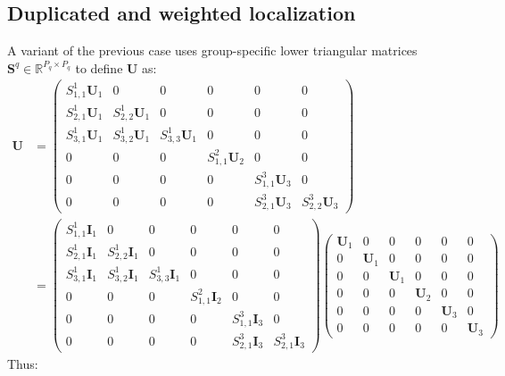 \documentclass[12pt]{scrartcl}
\begin{document}
\subsection{Duplicated and weighted localization}
A variant of the previous case uses group-specific lower triangular matrices $\mathbf{S}^q \in \mathbb{R}^{P_q \times P_q}$ to define $\mathbf{U}$ as: 
\begin{align}
\mathbf{U} & = \left( \begin{array}{ccc|c|ccc}
S^1_{1,1} \mathbf{U}_1 & 0 & 0 & 0 & 0 & 0 \\
S^1_{2,1} \mathbf{U}_1 & S^1_{2,2} \mathbf{U}_1 & 0 & 0 & 0 & 0 \\
S^1_{3,1} \mathbf{U}_1 & S^1_{3,2} \mathbf{U}_1 & S^1_{3,3} \mathbf{U}_1 & 0 & 0 & 0 \\
\hline
0 & 0 & 0 & S^2_{1,1} \mathbf{U}_2 & 0 & 0 \\[0.3ex]
\hline
0 & 0 & 0 & 0 & S^3_{1,1} \mathbf{U}_3 & 0 \\
0 & 0 & 0 & 0 & S^3_{2,1} \mathbf{U}_3 & S^3_{2,2} \mathbf{U}_3
\end{array} \right) \nonumber \\
& = \left( \begin{array}{ccc|c|ccc}
S^1_{1,1} \mathbf{I}_1 & 0 & 0 & 0 & 0 & 0 \\
S^1_{2,1} \mathbf{I}_1 & S^1_{2,2} \mathbf{I}_1 & 0 & 0 & 0 & 0 \\
S^1_{3,1} \mathbf{I}_1 & S^1_{3,2} \mathbf{I}_1 & S^1_{3,3} \mathbf{I}_1 & 0 & 0 & 0 \\
\hline
0 & 0 & 0 & S^2_{1,1} \mathbf{I}_2 & 0 & 0 \\[0.3ex]
\hline
0 & 0 & 0 & 0 & S^3_{1,1} \mathbf{I}_3 & 0 \\
0 & 0 & 0 & 0 & S^3_{2,1} \mathbf{I}_3 & S^3_{2,1} \mathbf{I}_3
\end{array} \right) \left( \begin{array}{ccc|c|cc}
\mathbf{U}_1 & 0 & 0 & 0 & 0 & 0 \\
0 & \mathbf{U}_1 & 0 & 0 & 0 & 0 \\
0 & 0 & \mathbf{U}_1 & 0 & 0 & 0 \\[0.3ex]
\hline
0 & 0 & 0 & \mathbf{U}_2 & 0 & 0 \\[0.3ex]
\hline
0 & 0 & 0 & 0 & \mathbf{U}_3 & 0 \\
0 & 0 & 0 & 0 & 0 & \mathbf{U}_3
\end{array} \right)
\end{align}
Thus:
\end{document}
